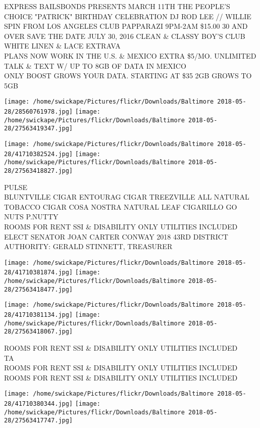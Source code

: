 \documentclass[10pt,letterpaper]{article}
\begin{document}
EXPRESS BAILSBONDS PRESENTS MARCH 11TH THE PEOPLE'S CHOICE "PATRICK" BIRTHDAY CELEBRATION DJ ROD LEE // WILLIE SPIN FROM LOS ANGELES CLUB PAPPARAZI 9PM{-}2AM \$15.00 30 AND OVER SAVE THE DATE JULY 30, 2016 CLEAN \& CLASSY BOY'S CLUB WHITE LINEN \& LACE EXTRAVA\\
PLANS NOW WORK IN THE U.S. \& MEXICO EXTRA \$5/MO. UNLIMITED TALK \& TEXT W/ UP TO 8GB OF DATA IN MEXICO\\
ONLY BOOST GROWS YOUR DATA.  STARTING AT \$35 2GB GROWS TO 5GB\\
\pagebreak

\texttt{[image: /home/swickape/Pictures/flickr/Downloads/Baltimore 2018-05-28/28560761978.jpg]}
\texttt{[image: /home/swickape/Pictures/flickr/Downloads/Baltimore 2018-05-28/27563419347.jpg]}

\texttt{[image: /home/swickape/Pictures/flickr/Downloads/Baltimore 2018-05-28/41710382524.jpg]}
\texttt{[image: /home/swickape/Pictures/flickr/Downloads/Baltimore 2018-05-28/27563418827.jpg]}

PULSE\\
BLUNTVILLE CIGAR ENTOURAG CIGAR TREEZVILLE ALL NATURAL TOBACCO CIGAR COSA NOSTRA NATURAL LEAF CIGARILLO GO NUTS P.NUTTY\\
ROOMS FOR RENT SSI \& DISABILITY ONLY UTILITIES INCLUDED\\
ELECT SENATOR JOAN CARTER CONWAY 2018 43RD DISTRICT AUTHORITY: GERALD STINNETT, TREASURER\\
\pagebreak

\texttt{[image: /home/swickape/Pictures/flickr/Downloads/Baltimore 2018-05-28/41710381874.jpg]}
\texttt{[image: /home/swickape/Pictures/flickr/Downloads/Baltimore 2018-05-28/27563418477.jpg]}

\texttt{[image: /home/swickape/Pictures/flickr/Downloads/Baltimore 2018-05-28/41710381134.jpg]}
\texttt{[image: /home/swickape/Pictures/flickr/Downloads/Baltimore 2018-05-28/27563418067.jpg]}

ROOMS FOR RENT SSI \& DISABILITY ONLY UTILITIES INCLUDED\\
TA\\
ROOMS FOR RENT SSI \& DISABILITY ONLY UTILITIES INCLUDED\\
ROOMS FOR RENT SSI \& DISABILITY ONLY UTILITIES INCLUDED\\
\pagebreak

\texttt{[image: /home/swickape/Pictures/flickr/Downloads/Baltimore 2018-05-28/41710380344.jpg]}
\texttt{[image: /home/swickape/Pictures/flickr/Downloads/Baltimore 2018-05-28/27563417747.jpg]}
\end{document}
